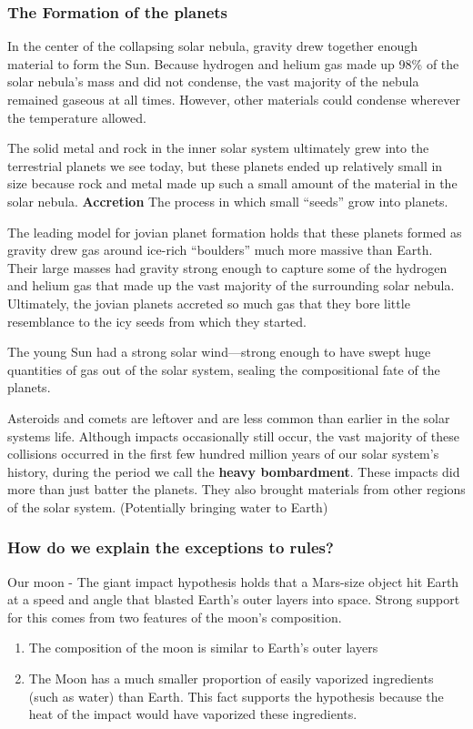 \documentclass[12pt]{article}
\begin{document}
\subsubsection{The Formation of the planets}
In the center of the collapsing solar nebula, gravity drew together enough material to form the Sun. Because hydrogen and helium gas made up 98\% of the solar nebula’s mass and did not condense, the vast majority of the nebula remained gaseous at all times. However, other materials could condense wherever the temperature allowed.

The solid metal and rock in the inner solar system ultimately grew into the terrestrial planets we see today, but these planets ended up relatively small in size because rock and metal made up such a small amount of the material in the solar nebula. {\bf Accretion} The process in which small ``seeds'' grow into planets.

The leading model for jovian planet formation holds that these planets formed as gravity drew gas around ice-rich ``boulders'' much more massive than Earth. Their large masses had gravity strong enough to capture some of the hydrogen and
helium gas that made up the vast majority of the surrounding solar nebula. Ultimately, the jovian planets accreted so
much gas that they bore little resemblance to the icy seeds from which
they started.

The young Sun had a strong solar wind—strong enough to have swept huge quantities of gas out of the solar system, sealing the compositional fate of the planets.

Asteroids and comets are leftover and are less common than earlier in the solar systems life. Although impacts occasionally still occur, the vast majority of these collisions occurred in the first few hundred million years of our solar system’s history, during the period we call the {\bf heavy bombardment}. These impacts did more than just batter the planets. They also brought materials from other regions of the solar system. (Potentially bringing water to Earth)

\subsubsection{How do we explain the exceptions to rules?}
Our moon - The giant impact hypothesis holds that a Mars-size object hit Earth at a speed and angle that blasted Earth’s outer layers into space. Strong support for this comes from two features of the moon's composition.
\begin{enumerate}
\item The composition of the moon is similar to Earth's outer layers
\item The Moon has a much smaller proportion of easily vaporized ingredients (such as water) than Earth. This fact supports the hypothesis because the heat of the impact would have vaporized these ingredients.
\end{enumerate}
\end{document}
